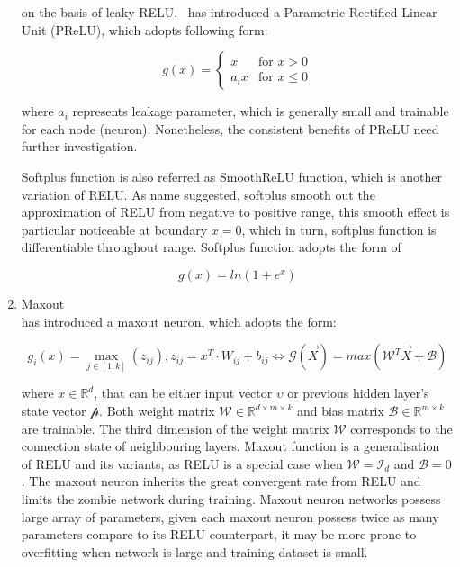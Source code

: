 \begin{enumerate}
on the basis of leaky RELU,~\citet{He_2015} has introduced a Parametric Rectified Linear Unit (PReLU), which adopts following form:

\begin{equation}
    g(x) = \left\{ 
    \begin{array}{lr}
        x & \text{for } x > 0 \\
        a_{i}x & \text{for } x\leq 0
    \end{array}\right.
\end{equation}

where $a_{i}$ represents leakage parameter, which is generally small and trainable for each node (neuron). Nonetheless, the consistent benefits of PReLU need further investigation. 
\par 
Softplus function is also referred as SmoothReLU function, which is another variation of RELU. As name suggested, softplus smooth out the approximation of RELU from negative to positive range, this smooth effect is particular noticeable at boundary $x=0$, which in turn, softplus function is differentiable throughout range. Softplus function adopts the form of   

\begin{equation}
    g(x) = ln(1+e^{x})
\end{equation}

\item Maxout \\
\citealt{Goodfellow:2013:MN:3042817.3043084} has introduced a maxout neuron, which adopts the form:

\begin{equation}
    g_i(x) = \max_{j\in[1,k]}(z_{ij}), z_{ij} = x^T \cdot W_{ij} + b_{ij} \iff
    \mathcal{G}(\vec{X}) = max(\mathcal{W}^T\vec{X} + \mathcal{B}) 
\end{equation}

where $x\in\mathbb{R}^d$, that can be either input vector $\upsilon$ or previous hidden layer's state vector $\mathcal{p}$. Both weight matrix $\mathcal{W}\in\mathbb{R}^{d\times m\times	k}$ and bias matrix $\mathcal{B}\in\mathbb{R}^{m\times k}$ are trainable. The third dimension of the weight matrix $\mathcal{W}$ corresponds to the connection state of neighbouring layers. Maxout function is a generalisation of RELU and its variants, as RELU is a special case when $\mathcal{W} = \mathcal{I}_d$ and $\mathcal{B}=0$. The maxout neuron inherits the great convergent rate from RELU and limits the zombie network during training. Maxout neuron networks possess large array of parameters, given each maxout neuron possess twice as many parameters compare to its RELU counterpart, it may be more prone to overfitting when network is large and training dataset is small. 


\end{enumerate}
